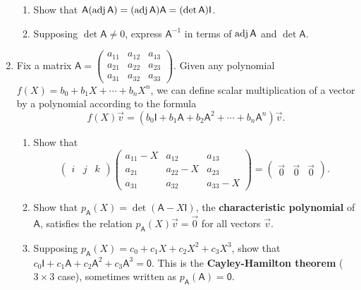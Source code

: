 \begin{enumerate}
\begin{enumerate}
\item Show that $\mathsf{A}(\operatorname{adj}\mathsf{A}) = (\operatorname{adj}\mathsf{A})\mathsf{A} = (\det\mathsf{A})\mathsf{I}$.
\item Supposing $\det\mathsf{A}\neq 0$, express $\mathsf{A}^{-1}$ in terms of $\operatorname{adj}\mathsf{A}$ and $\det\mathsf{A}$.
\end{enumerate}
\item Fix a matrix $\mathsf{A} = \begin{pmatrix} a_{11} & a_{12} & a_{13} \\ a_{21} & a_{22} & a_{23} \\ a_{31} & a_{32} & a_{33} \end{pmatrix}$. Given any polynomial $f(X) = b_0 + b_1X + \cdots + b_nX^n$, we can define scalar multiplication of a vector by a polynomial according to the formula
\begin{equation*}
f(X)\vec{v} = (b_0\mathsf{I} + b_1\mathsf{A} + b_2\mathsf{A}^2 + \cdots + b_n\mathsf{A}^n)\vec{v}.
\end{equation*}
\begin{enumerate}
\item Show that
\begin{equation*}
\begin{pmatrix} \unit{i} & \unit{j} & \unit{k} \end{pmatrix}\begin{pmatrix} a_{11} - X & a_{12} & a_{13} \\ a_{21} & a_{22} - X & a_{23} \\ a_{31} & a_{32} & a_{33} - X \end{pmatrix} = \begin{pmatrix} \vec{0} & \vec{0} & \vec{0} \end{pmatrix}.
\end{equation*}
\item Show that $p_{\mathsf{A}}(X) = \det(\mathsf{A} - X\mathsf{I})$, the \textbf{characteristic polynomial} of $\mathsf{A}$, satisfies the relation $p_{\mathsf{A}}(X)\vec{v} = \vec{0}$ for all vectors $\vec{v}$.
\item Supposing $p_{\mathsf{A}}(X) = c_0 + c_1X + c_2X^2 + c_3X^3$, show that $c_0\mathsf{I} + c_1\mathsf{A} + c_2\mathsf{A}^2 + c_3\mathsf{A}^3 = \mathsf{0}$. This is the \textbf{Cayley-Hamilton theorem} ($3\times 3$ case), sometimes written as $p_{\mathsf{A}}(\mathsf{A}) = \mathsf{0}$.
\end{enumerate}
\end{enumerate}


